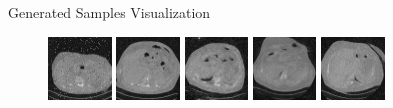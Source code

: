 \begin{frame}{Generated Samples Visualization}
    \begin{figure}
        \centering
        \includegraphics[width=0.15\textwidth]{media/epoch_81_0.png}\hspace{0.5em}
        \includegraphics[width=0.15\textwidth]{media/epoch_81_1.png}\hspace{0.5em}
        \includegraphics[width=0.15\textwidth]{media/epoch_81_2.png}\hspace{0.5em}
        \includegraphics[width=0.15\textwidth]{media/epoch_81_3.png}\hspace{0.5em}
        \includegraphics[width=0.15\textwidth]{media/epoch_81_4.png}

        \vspace{1em} %


\end{figure}
\end{frame}
